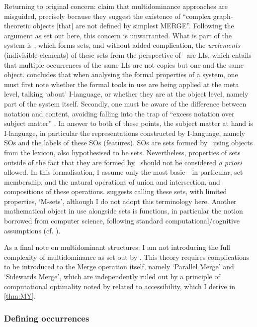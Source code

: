 Returning to  original concern: \textcite{ChomskyN.etal_2019} claim that multidominance approaches are misguided, precisely because they suggest the existence of ``complex graph-theoretic objects [that] are not defined by simplest MERGE''. Following the argument as set out here, this concern is unwarranted. What is part of the system is \Merge, which forms sets, and without added complication, the \textit{urelements} (indivisible elements) of these sets from the perspective of \Merge\ are LIs, which entails that multiple occurrences of the same LIs are not copies but one and the same object. \textcite{GartnerHM_2022} concludes that when analysing the formal properties of a system, one must first note whether the formal tools in use are being applied at the meta level, talking `about' I-language, or whether they are at the object level, namely part of the system itself. Secondly, one must be aware of the difference between notation and content, avoiding falling into the trap of ``excess notation over subject matter'' \parencite[5]{QuineWV_1941}. In answer to both of these points, the subject matter at hand is I-language, in particular the representations constructed by I-language, namely SOs and the labels of these SOs (features). SOs are sets formed by \Merge\ using objects from the lexicon, also hypothesised to be sets. Nevertheless, properties of sets outside of the fact that they are formed by \Merge\ should not be considered \textit{a priori} allowed. In this formalisation, I assume only the most basic---in particular, set membership, and the natural operations of union and intersection, and compositions of these operations. \textcite{GartnerHM_2022} suggests calling these sets, with limited properties, `M-sets', although I do not adopt this terminology here. Another mathematical object in use alongside sets is functions, in particular the notion borrowed from computer science, following standard computational/cognitive assumptions (cf. ).

As a final note on multidominant structures: I am not introducing the full complexity of multidominance as set out by \textcite{CitkoB_2011a}. This theory requires complications to be introduced to the Merge operation itself, namely `Parallel Merge' and `Sidewards Merge', which are independently ruled out by a principle of computational optimality noted by \textcite{ChomskyN_2019a,ChomskyN_2021} related to accessibility, which I derive in \autoref{thm:MY}.

\subsubsection{Defining occurrences}

